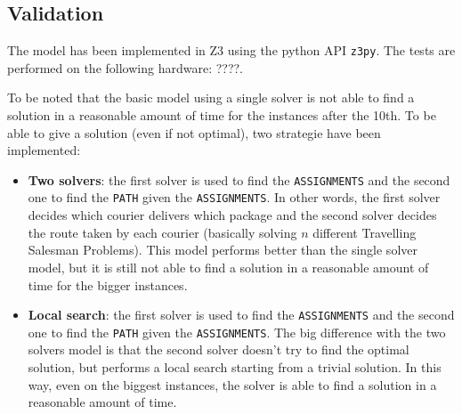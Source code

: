 \subsection{Validation}

The model has been implemented in Z3 using the python API \texttt{z3py}. The tests are performed on the following hardware: ????.

To be noted that the basic model using a single solver is not able to find a solution in a reasonable amount of time for the instances after the 10th. To be able to give a solution (even if not optimal), two strategie have been implemented:

\begin{itemize}
    \item \textbf{Two solvers}: the first solver is used to find the \texttt{ASSIGNMENTS} and the second one to find the \texttt{PATH} given the \texttt{ASSIGNMENTS}. In other words, the first solver decides which courier delivers which package and the second solver decides the route taken by each courier (basically solving $n$ different Travelling Salesman Problems). This model performs better than the single solver model, but it is still not able to find a solution in a reasonable amount of time for the bigger instances.

    \item \textbf{Local search}: the first solver is used to find the \texttt{ASSIGNMENTS} and the second one to find the \texttt{PATH} given the \texttt{ASSIGNMENTS}. The big difference with the two solvers model is that the second solver doesn't try to find the optimal solution, but performs a local search starting from a trivial solution. In this way, even on the biggest instances, the solver is able to find a solution in a reasonable amount of time.

\end{itemize}
    